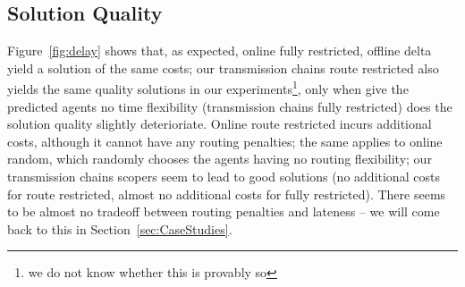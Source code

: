 \documentclass{article}
\begin{document}
\subsection{Solution Quality}

Figure~\ref{fig:delay} shows that, as expected, online fully restricted, offline delta yield a solution of the same costs; our transmission chains route restricted also yields the same quality solutions in our experiments\footnote{we do not know whether this is provably so}, only when give the predicted agents no time flexibility (transmission chains fully restricted) does the solution quality slightly deterioriate. Online route restricted incurs additional costs, although it cannot have any routing penalties; the same applies to online random, which randomly chooses the agents having no routing flexibility; our transmission chains scopers seem to lead to good solutions (no additional costs for route restricted, almost no additional costs for fully restricted). There seems to be almost no tradeoff between routing penalties and lateness -- we will come back to this in Section~\ref{sec:CaseStudies}.
\end{document}
